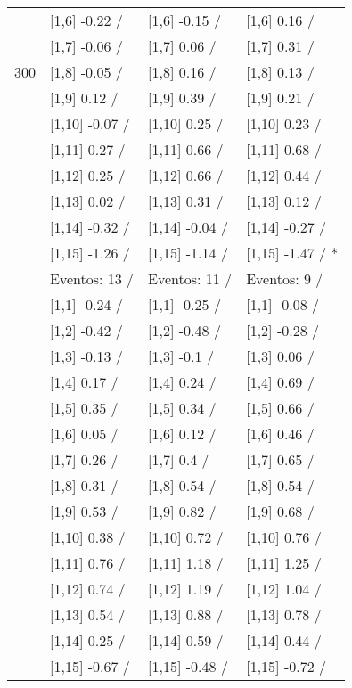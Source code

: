 \begin{table}
\begin{tabular}[t]{llll}
 & {}[1,6] -0.22  / & {}[1,6] -0.15  / & {}[1,6] 0.16  /\\
 & {}[1,7] -0.06  / & {}[1,7] 0.06  / & {}[1,7] 0.31  /\\
300 & {}[1,8] -0.05  / & {}[1,8] 0.16  / & {}[1,8] 0.13  /\\
\addlinespace
 & {}[1,9] 0.12  / & {}[1,9] 0.39  / & {}[1,9] 0.21  /\\
 & {}[1,10] -0.07  / & {}[1,10] 0.25  / & {}[1,10] 0.23  /\\
 & {}[1,11] 0.27  / & {}[1,11] 0.66  / & {}[1,11] 0.68  /\\
 & {}[1,12] 0.25  / & {}[1,12] 0.66  / & {}[1,12] 0.44  /\\
 & {}[1,13] 0.02  / & {}[1,13] 0.31  / & {}[1,13] 0.12  /\\
\addlinespace
 & {}[1,14] -0.32  / & {}[1,14] -0.04  / & {}[1,14] -0.27  /\\
 & {}[1,15] -1.26  / & {}[1,15] -1.14  / & {}[1,15] -1.47  / *\\
 & Eventos:  13 / & Eventos:  11 / & Eventos:  9 /\\
 & {}[1,1] -0.24  / & {}[1,1] -0.25  / & {}[1,1] -0.08  /\\
 & {}[1,2] -0.42  / & {}[1,2] -0.48  / & {}[1,2] -0.28  /\\
\addlinespace
 & {}[1,3] -0.13  / & {}[1,3] -0.1  / & {}[1,3] 0.06  /\\
 & {}[1,4] 0.17  / & {}[1,4] 0.24  / & {}[1,4] 0.69  /\\
 & {}[1,5] 0.35  / & {}[1,5] 0.34  / & {}[1,5] 0.66  /\\
 & {}[1,6] 0.05  / & {}[1,6] 0.12  / & {}[1,6] 0.46  /\\
 & {}[1,7] 0.26  / & {}[1,7] 0.4  / & {}[1,7] 0.65  /\\
\addlinespace
500 & {}[1,8] 0.31  / & {}[1,8] 0.54  / & {}[1,8] 0.54  /\\
 & {}[1,9] 0.53  / & {}[1,9] 0.82  / & {}[1,9] 0.68  /\\
 & {}[1,10] 0.38  / & {}[1,10] 0.72  / & {}[1,10] 0.76  /\\
 & {}[1,11] 0.76  / & {}[1,11] 1.18  / & {}[1,11] 1.25  /\\
 & {}[1,12] 0.74  / & {}[1,12] 1.19  / & {}[1,12] 1.04  /\\
\addlinespace
 & {}[1,13] 0.54  / & {}[1,13] 0.88  / & {}[1,13] 0.78  /\\
 & {}[1,14] 0.25  / & {}[1,14] 0.59  / & {}[1,14] 0.44  /\\
 & {}[1,15] -0.67  / & {}[1,15] -0.48  / & {}[1,15] -0.72  /\\
\bottomrule
\end{tabular}
\end{table}
